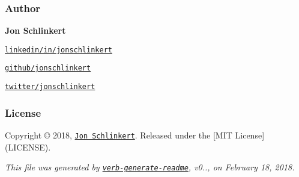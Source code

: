 \subsubsection*{Author}

{\bfseries Jon Schlinkert}


\begin{DoxyItemize}
\item \href{https://linkedin.com/in/jonschlinkert}{\tt linkedin/in/jonschlinkert}
\item \href{https://github.com/jonschlinkert}{\tt github/jonschlinkert}
\item \href{https://twitter.com/jonschlinkert}{\tt twitter/jonschlinkert}
\end{DoxyItemize}

\subsubsection*{License}

Copyright © 2018, \href{https://github.com/jonschlinkert}{\tt Jon Schlinkert}. Released under the \mbox{[}M\+IT License\mbox{]}(L\+I\+C\+E\+N\+SE).





{\itshape This file was generated by \href{https://github.com/verbose/verb-generate-readme}{\tt verb-\/generate-\/readme}, v0.., on February 18, 2018.} 
